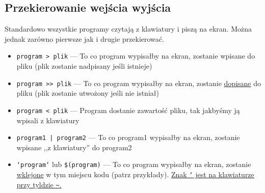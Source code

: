 \documentclass[polish]{instrukcja}
\begin{document}
\subsection{Przekierowanie wejścia wyjścia}
Standardowo wszystkie programy czytają z klawiatury i piszą na ekran. Można jednak zarówno pierwsze jak i drugie przekierować.
\begin{itemize}
\item {\tt {\red program} {\blue > plik}} --- To co program wypisałby na ekran, zostanie wpisane do {\blue plik}u ({\blue plik} zostanie nadpisany jeśli istnieje)
\item {\tt {\red program} {\blue >> plik}} --- To co program wypisałby na ekran, zostanie \uline{dopisane} do {\blue plik}u ({\blue plik} zostanie utwożony jeśli nie istniał)
\item {\tt {\red program} {\blue < plik}} --- Program dostanie zawartość {\blue plik}u, tak jakbyśmy ją wpisali z klawiatury
\item {\tt {\red program1} {\blue |} {\red program2}} --- To co {\red program1} wypisałby na ekran, zostanie wpisane ,,z klawiatury'' do {\red program2}
\item {\tt {\blue `}{\red program}{\blue `}} lub {\tt {\blue \$(}{\red program}{\blue )}} --- To co program wypisałby na ekran, zostanie \uline{wklejone} w tym miejscu kodu (patrz przykłady). \uline{Znak {\tt\blue `} jest na klawiaturze przy tyldzie {\tt\textasciitilde{}}.}
\end{itemize}
\end{document}
